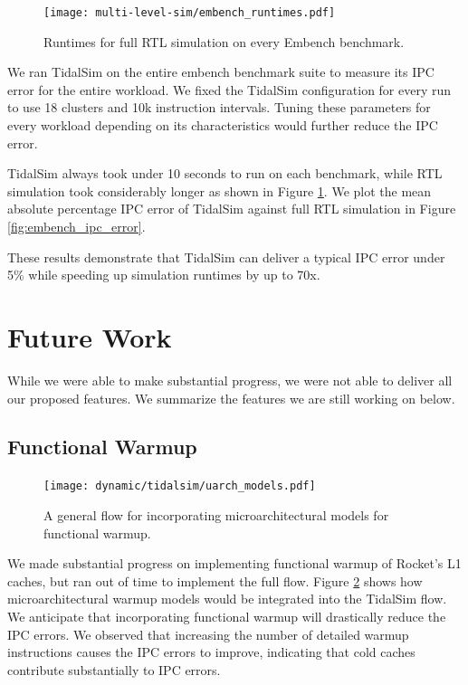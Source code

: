 \documentclass[sigplan,nonacm,10pt]{acmart}
\begin{document}
\begin{figure}
  \texttt{[image: multi-level-sim/embench\_runtimes.pdf]}
  \caption{Runtimes for full RTL simulation on every Embench benchmark.}
  \label{fig:embench_runtimes}
\end{figure}

We ran TidalSim on the entire embench benchmark suite to measure its IPC error for the entire workload.
We fixed the TidalSim configuration for every run to use 18 clusters and 10k instruction intervals.
Tuning these parameters for every workload depending on its characteristics would further reduce the IPC error.

TidalSim always took under 10 seconds to run on each benchmark, while RTL simulation took considerably longer as shown in Figure \ref{fig:embench_runtimes}.
We plot the mean absolute percentage IPC error of TidalSim against full RTL simulation in Figure \ref{fig:embench_ipc_error}.

These results demonstrate that TidalSim can deliver a typical IPC error under 5\% while speeding up simulation runtimes by up to 70x.

\section{Future Work}

While we were able to make substantial progress, we were not able to deliver all our proposed features.
We summarize the features we are still working on below.

\subsection{Functional Warmup}

\begin{figure}
  \texttt{[image: dynamic/tidalsim/uarch\_models.pdf]}
  \caption{A general flow for incorporating microarchitectural models for functional warmup.}
  \label{fig:uarch_models}
\end{figure}

We made substantial progress on implementing functional warmup of Rocket's L1 caches, but ran out of time to implement the full flow.
Figure \ref{fig:uarch_models} shows how microarchitectural warmup models would be integrated into the TidalSim flow.
We anticipate that incorporating functional warmup will drastically reduce the IPC errors.
We observed that increasing the number of detailed warmup instructions causes the IPC errors to improve, indicating that cold caches contribute substantially to IPC errors.
\end{document}
